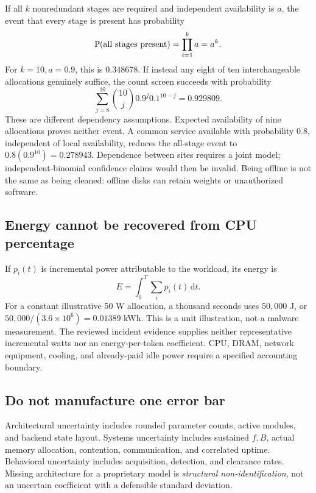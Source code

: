 \documentclass[11pt]{article}
\newcommand{\dd}{\mathrm d}
\newcommand{\Prb}{\mathbb P}
\begin{document}
If all $k$ nonredundant stages are required and independent availability is $a$, the event that every stage is present has probability
\begin{equation}
\Prb(\hbox{all stages present})=\prod_{i=1}^k a=a^k.
\end{equation}
For $k=10,a=0.9$, this is $0.348678$. If instead any eight of ten interchangeable allocations genuinely suffice, the count screen succeeds with probability
\begin{equation}
\sum_{j=8}^{10}\binom{10}j0.9^j0.1^{10-j}=0.929809.
\end{equation}
These are different dependency assumptions. Expected availability of nine allocations proves neither event. A common service available with probability $0.8$, independent of local availability, reduces the all-stage event to $0.8(0.9^{10})=0.278943$. Dependence between sites requires a joint model; independent-binomial confidence claims would then be invalid. Being offline is not the same as being cleaned: offline disks can retain weights or unauthorized software.

\subsection{Energy cannot be recovered from CPU percentage}
If $p_i(t)$ is incremental power attributable to the workload, its energy is
\begin{equation}
E=\int_0^T\sum_i p_i(t)\,\dd t.
\end{equation}
For a constant illustrative 50 W allocation, a thousand seconds uses $50{,}000$ J, or $50{,}000/(3.6\times10^6)=0.01389$ kWh. This is a unit illustration, not a malware measurement. The reviewed incident evidence supplies neither representative incremental watts nor an energy-per-token coefficient. CPU, DRAM, network equipment, cooling, and already-paid idle power require a specified accounting boundary.

\subsection{Do not manufacture one error bar}
Architectural uncertainty includes rounded parameter counts, active modules, and backend state layout. Systems uncertainty includes sustained $f,B$, actual memory allocation, contention, communication, and correlated uptime. Behavioral uncertainty includes acquisition, detection, and clearance rates. Missing architecture for a proprietary model is \emph{structural non-identification}, not an uncertain coefficient with a defensible standard deviation.
\end{document}
